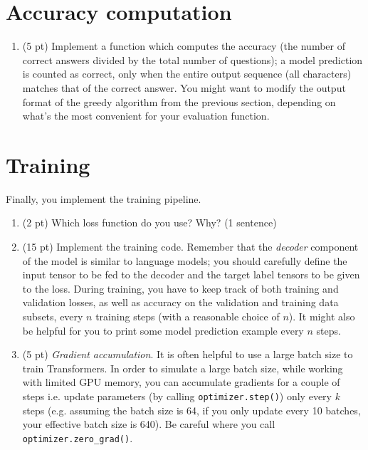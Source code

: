 \documentclass[a4paper,11pt]{article}
\begin{document}
\section{Accuracy computation}
\begin{enumerate}
\item (5 pt) Implement a function which computes the accuracy (the number of correct answers divided by the total number of questions);
a model prediction is counted as correct, only when the entire output sequence
(all characters) matches that of the correct answer.
You might want to modify the output format of the greedy algorithm from the previous section,
depending on what's the most convenient for your evaluation function.
\end{enumerate}

\section{Training}
Finally, you implement the training pipeline.
\begin{enumerate}
\item (2 pt) Which loss function do you use? Why? (1 sentence)
\item (15 pt) Implement the training code.
Remember that the \textit{decoder} component of the model is similar to language models;
you should carefully define the input tensor to be fed to the decoder and the target label tensors to be given to the loss. 
During training, you have to keep track of both training and validation losses, as well as
accuracy on the validation and training data subsets, every $n$ training steps (with a reasonable choice of $n$).
It might also be helpful for you to print some model prediction example every $n$ steps.
\item (5 pt) \textit{Gradient accumulation}. It is often helpful to use a large batch size to train Transformers.
In order to simulate a large batch size, while working with limited GPU memory,
you can accumulate gradients for a couple of steps i.e. update parameters (by calling \texttt{optimizer.step()})
only every $k$ steps (e.g. assuming the batch size is 64, if you only update every 10 batches, your effective batch size is 640).
Be careful where you call \texttt{optimizer.zero\_grad()}.
\end{enumerate}
\end{document}
